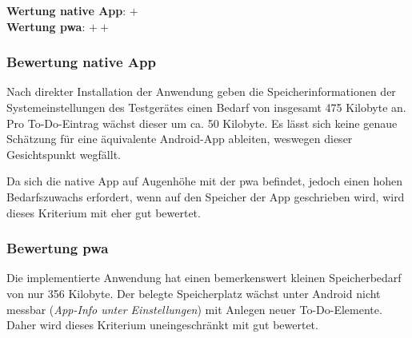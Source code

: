 \textbf{Wertung native App}: $+$\\
\textbf{Wertung \ac{pwa}}: $++$

\subsubsection{Bewertung native App}
Nach direkter Installation der Anwendung geben die Speicherinformationen der Systemeinstellungen des Testgerätes einen Bedarf von insgesamt 475 Kilobyte an. Pro To-Do-Eintrag wächst dieser um ca. 50 Kilobyte. Es lässt sich keine genaue Schätzung für eine äquivalente Android-App ableiten, weswegen dieser Gesichtspunkt wegfällt.

Da sich die native App auf Augenhöhe mit der \ac{pwa} befindet, jedoch einen hohen Bedarfszuwachs erfordert, wenn auf den Speicher der App geschrieben wird, wird dieses Kriterium mit eher gut bewertet.

\subsubsection{Bewertung \ac{pwa}}
Die implementierte Anwendung hat einen bemerkenswert kleinen Speicherbedarf von nur 356 Kilobyte. Der belegte Speicherplatz wächst unter Android nicht messbar (\textit{App-Info unter Einstellungen}) mit Anlegen neuer To-Do-Elemente. Daher wird dieses Kriterium uneingeschränkt mit gut bewertet.